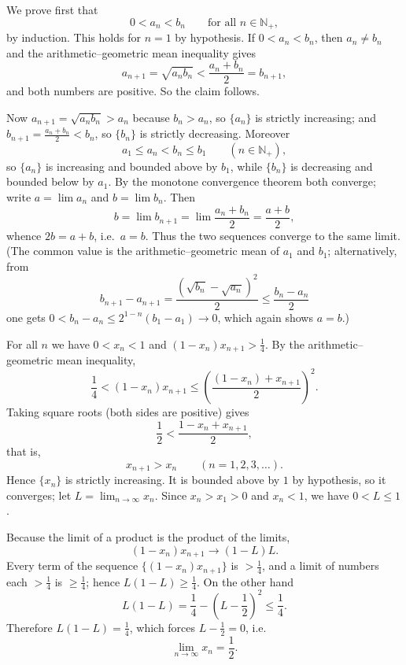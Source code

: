 \documentclass[11pt,a4paper]{article}
\newenvironment{solution}[1]{%
  \par\addvspace{1.7ex}%
  \noindent{\color{solutioncolor}\textbf{#1}}\hspace{0.55em}\ignorespaces}%
  {\par\addvspace{0.9ex}}
\begin{document}
\begin{solution}{Solution 2.3.2}\label{xs:2.3.2}
We prove first that
\[
0<a_n<b_n\qquad\text{for all } n\in\mathbb N_+,
\]
by induction. This holds for $n=1$ by hypothesis. If $0<a_n<b_n$, then $a_n\ne b_n$ and the arithmetic--geometric mean inequality gives
\[
a_{n+1}=\sqrt{a_nb_n}<\frac{a_n+b_n}{2}=b_{n+1},
\]
and both numbers are positive. So the claim follows.

Now $a_{n+1}=\sqrt{a_nb_n}>a_n$ because $b_n>a_n$, so $\{a_n\}$ is strictly increasing; and $b_{n+1}=\frac{a_n+b_n}{2}<b_n$, so $\{b_n\}$ is strictly decreasing. Moreover
\[
a_1\le a_n<b_n\le b_1\qquad(n\in\mathbb N_+),
\]
so $\{a_n\}$ is increasing and bounded above by $b_1$, while $\{b_n\}$ is decreasing and bounded below by $a_1$. By the monotone convergence theorem both converge; write $a=\lim a_n$ and $b=\lim b_n$. Then
\[
b=\lim b_{n+1}=\lim\frac{a_n+b_n}{2}=\frac{a+b}{2},
\]
whence $2b=a+b$, i.e.\ $a=b$. Thus the two sequences converge to the same limit. (The common value is the arithmetic--geometric mean of $a_1$ and $b_1$; alternatively, from
\[
b_{n+1}-a_{n+1}=\frac{(\sqrt{b_n}-\sqrt{a_n})^2}{2}\le\frac{b_n-a_n}{2}
\]
one gets $0<b_n-a_n\le 2^{1-n}(b_1-a_1)\to 0$, which again shows $a=b$.)
\end{solution}

\begin{solution}{Solution 2.3.3}\label{xs:2.3.3}
For all $n$ we have $0<x_n<1$ and $(1-x_n)x_{n+1}>\frac14$. By the arithmetic--geometric mean inequality,
\[
\frac14<(1-x_n)x_{n+1}\le\left(\frac{(1-x_n)+x_{n+1}}{2}\right)^2 .
\]
Taking square roots (both sides are positive) gives
\[
\frac12<\frac{1-x_n+x_{n+1}}{2},
\]
that is,
\[
x_{n+1}>x_n\qquad(n=1,2,3,\dots).
\]
Hence $\{x_n\}$ is strictly increasing. It is bounded above by $1$ by hypothesis, so it converges; let $L=\lim_{n\to\infty}x_n$. Since $x_n>x_1>0$ and $x_n<1$, we have $0<L\le1$.

Because the limit of a product is the product of the limits,
\[
(1-x_n)x_{n+1}\longrightarrow (1-L)L .
\]
Every term of the sequence $\{(1-x_n)x_{n+1}\}$ is $>\frac14$, and a limit of numbers each $>\frac14$ is $\ge\frac14$; hence $L(1-L)\ge\frac14$. On the other hand
\[
L(1-L)=\frac14-\left(L-\frac12\right)^2\le\frac14 .
\]
Therefore $L(1-L)=\frac14$, which forces $L-\frac12=0$, i.e.\
\[
\lim_{n\to\infty}x_n=\frac12 .
\]
\end{solution}
\end{document}
